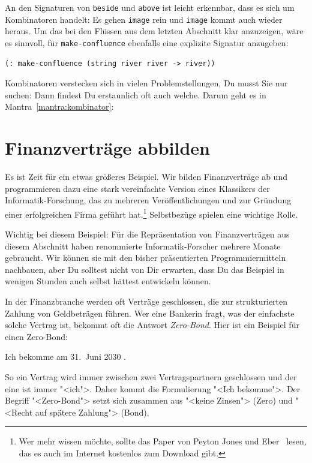 An den Signaturen von \lstinline{beside} und \lstinline{above} ist
leicht erkennbar, dass es sich um Kombinatoren handelt: Es gehen
\lstinline{image} rein und \lstinline{image} kommt auch wieder
heraus.  Um das bei den Flüssen aus dem letzten Abschnitt klar
anzuzeigen, wäre es sinnvoll, für \lstinline{make-confluence}
ebenfalls eine explizite Signatur anzugeben:
%
\begin{lstlisting}
(: make-confluence (string river river -> river))
\end{lstlisting}
%
Kombinatoren verstecken sich in vielen Problemstellungen, Du musst Sie
nur suchen: Dann findest Du erstaunlich oft auch welche.  Darum geht
es in Mantra~\ref{mantra:kombinator}:

\mantrakombinator*

\section{Finanzverträge abbilden}
\label{sec:financial-contracts}

%
Es ist Zeit für ein etwas größeres Beispiel.  Wir bilden
Finanzverträge ab und programmieren dazu eine stark vereinfachte
Version eines Klassikers der Informatik-Forschung, das zu mehreren
Veröffentlichungen und zur Gründung einer erfolgreichen Firma geführt
hat.\footnote{Wer mehr wissen möchte, sollte das Paper von Peyton
  Jones und Eber~\cite{FinancialContracts} lesen, das es auch im
  Internet kostenlos zum Download gibt.}  Selbstbezüge spielen eine wichtige
Rolle.

Wichtig bei diesem Beispiel: Für die Repräsentation von
Finanzverträgen aus diesem Abschnitt haben renommierte
Informatik-Forscher mehrere Monate gebraucht.  Wir können sie mit den
bisher präsentierten Programmiermitteln nachbauen, aber Du solltest
nicht von Dir erwarten, dass Du das Beispiel in wenigen Stunden auch
selbst hättest entwickeln können.

In der Finanzbranche werden oft Verträge geschlossen, die zur
strukturierten Zahlung von Geldbeträgen führen.  Wer eine Bankerin
fragt, was der einfachste solche Vertrag ist, bekommt oft die Antwort
\textit{Zero-Bond}.  Hier ist ein Beispiel für einen Zero-Bond:
%
\begin{center}
  Ich bekomme am 31.\ Juni 2030 .
\end{center}
%
So ein Vertrag wird immer zwischen zwei Vertragspartnern geschlossen und der
eine ist immer "<ich">.  Daher kommt die Formulierung "<Ich
bekomme">.  Der Begriff "<Zero-Bond"> setzt sich zusammen aus "<keine
Zinsen"> (Zero) und "<Recht auf spätere Zahlung"> (Bond).

